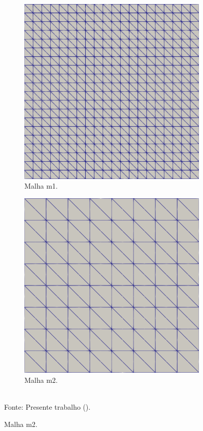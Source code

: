 \begin{figure}[h!]
    \centering
    \caption{Cavidade bidimensional - Malhas utilizadas para a análise de convergência.}
    \begin{subfigure}{0.49\textwidth}
        \centering
        \includegraphics[width=0.8\linewidth]{Figuras/Cavity/m2.png}
        \caption{Malha m1.}
    \end{subfigure}
    \begin{subfigure}{0.49\textwidth}
        \centering
        \includegraphics[width=0.8\linewidth]{Figuras/Cavity/m3.png}
        \caption{Malha m2.}
    \end{subfigure}
    \\Fonte: Presente trabalho (\the\year).
    \label{fig:cavity-mesh2}
\end{figure}

